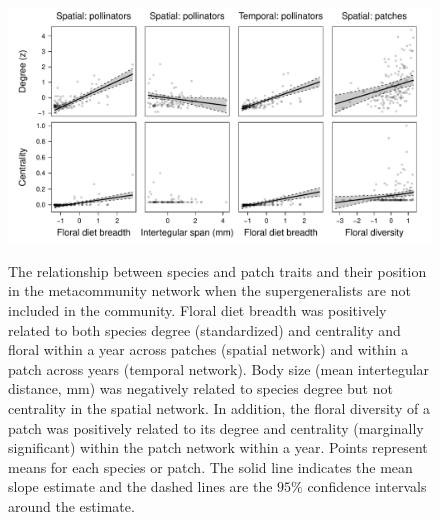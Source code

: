 \documentclass{article}\usepackage[]{graphicx}\usepackage[]{color}
\begin{document}
\begin{figure} \centering
\includegraphics[width=1\textwidth]{figure/all_sig_drop_li_htTRUE.pdf}
\label{fig:connectivity} \caption{The relationship between species and
patch traits and their position in the metacommunity network when the
supergeneralists are not included in the community. Floral diet
breadth was positively related to both species degree (standardized)
and centrality and floral within a year across patches (spatial
network) and within a patch across years (temporal network). Body size
(mean intertegular distance, mm) was negatively related to species
degree but not centrality in the spatial network.  In addition, the
floral diversity of a patch was positively related to its degree and
centrality (marginally significant) within the patch network within a
year. Points represent means for each species or patch. The solid line
indicates the mean slope estimate and the dashed lines are the $95\%$
confidence intervals around the estimate.}  \end{figure} \clearpage


\clearpage

\clearpage
\end{document}
